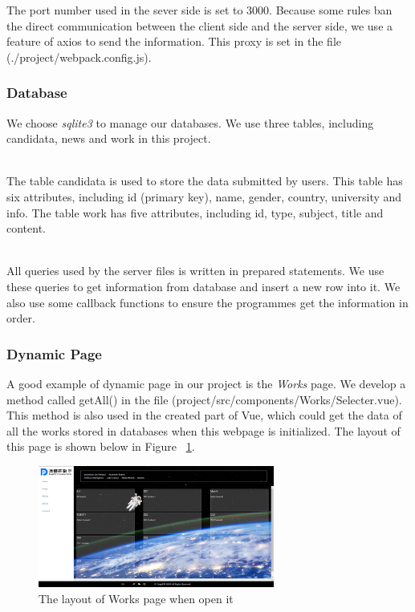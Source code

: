 \documentclass{article}
\begin{document}
The port number used in the sever side is set to 3000. Because some rules ban the 
direct communication between the client side and the server side, we use a feature
of axios to send the information. This proxy is set in the file (./project/webpack.config.js).
\subsubsection{Database}
We choose \textit{sqlite3} to manage our databases. 
We use three tables, including candidata, news and work in this project.

~\\
\noindent
The table candidata is used to store the data submitted by users. This table
has six attributes, including id (primary key), name, gender, country, university
and info. The table work has five attributes, including id, type, subject, title 
and content.

~\\
\noindent
All queries used by the server files is written in prepared statements. We use
these queries to get information from database and insert a new row into it. We
also use some callback functions to ensure the programmes get the information 
in order.



\subsubsection{Dynamic Page}
A good example of dynamic page in our project is the \textit{Works} page.
We develop a method called getAll() in the file
(project/src/components/Works/Selecter.vue). This method is also used in the 
created part of Vue, which could get the data of all the works stored in databases
when this webpage is initialized. The layout of this page is shown below in 
Figure ~\ref{fig: figure5}.

\begin{figure}[h]
    \centering
    \includegraphics[height=4cm]{img/sectionPNG/Works1.png}
    \caption{The layout of Works page when open it}
    \label{fig: figure5}
\end{figure}
\end{document}
